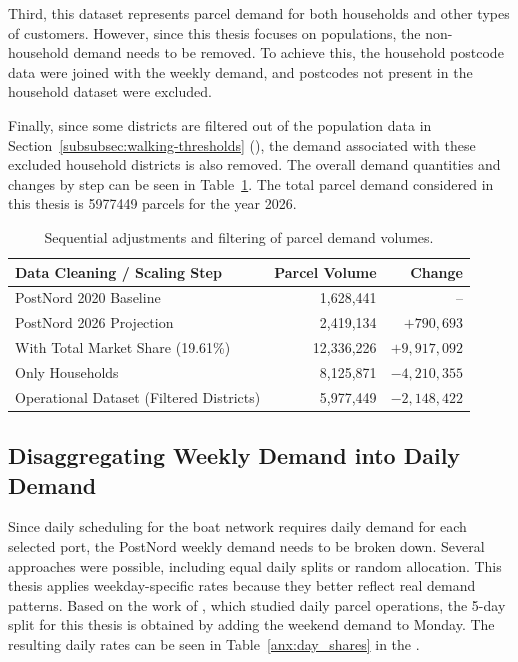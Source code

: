 \documentclass[12pt]{article}
\begin{document}
Third, this dataset represents parcel demand for both households and other types of customers. However, since this thesis focuses on populations, the non-household demand needs to be removed. To achieve this, the household postcode data were joined with the weekly demand, and postcodes not present in the household dataset were excluded.

Finally, since some districts are filtered out of the population data in Section~\ref{subsubsec:walking-thresholds} (), the demand associated with these excluded household districts is also removed. The overall demand quantities and changes by step can be seen in Table~\ref{tab:parcel_volumes}. The total parcel demand considered in this thesis is \num{5977449} parcels for the year 2026.

\begin{table}[htbp]
  \centering
  \caption{Sequential adjustments and filtering of parcel demand volumes.}
  \label{tab:parcel_volumes}
  \begin{tabular}{lrr}
    \toprule
    \textbf{Data Cleaning / Scaling Step}    & \textbf{Parcel Volume} & \textbf{Change} \\
    \midrule
    PostNord 2020 Baseline                   & 1,628,441              & --              \\
    PostNord 2026 Projection                 & 2,419,134              & \(+790,693\)    \\
    With Total Market Share (19.61\%)        & 12,336,226             & \(+9,917,092\)  \\
    Only Households                          & 8,125,871              & \(-4,210,355\)  \\
    Operational Dataset (Filtered Districts) & 5,977,449              & \(-2,148,422\)  \\
    \bottomrule
  \end{tabular}
\end{table}

\subsection{Disaggregating Weekly Demand into Daily Demand}
\label{subsec:weekly-to-daily-demand}

Since daily scheduling for the boat network requires daily demand for each selected port, the PostNord weekly demand needs to be broken down. Several approaches were possible, including equal daily splits or random allocation. This thesis applies weekday-specific rates because they better reflect real demand patterns. Based on the work of \textcite{dailydemand}, which studied daily parcel operations, the 5-day split for this thesis is obtained by adding the weekend demand to Monday. The resulting daily rates can be seen in Table~\ref{anx:day_shares} in the .
\end{document}
